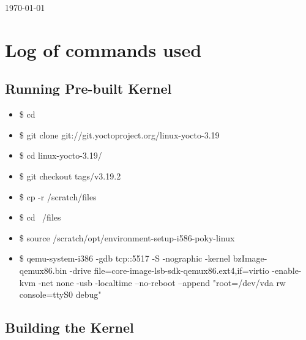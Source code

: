 \documentclass{article}
\begin{document}
\begin{titlepage}
{\large \today}\\[3cm] %




\vfill %



\end{titlepage}

\tableofcontents
\newpage

\section{Log of commands used}
\label{sec:introduction}

\subsection{Running Pre-built Kernel}

\begin{itemize}
\item \$ cd ~
\item \$ git clone git://git.yoctoproject.org/linux-yocto-3.19
\item \$ cd linux-yocto-3.19/
\item \$ git checkout tags/v3.19.2
\item \$ cp -r /scratch/files ~
\item \$ cd ~/files
\item\$  source /scratch/opt/environment-setup-i586-poky-linux
\item \$ qemu-system-i386 -gdb tcp::5517 -S -nographic -kernel bzImage-qemux86.bin -drive file=core-image-lsb-sdk-qemux86.ext4,if=virtio -enable-kvm -net none -usb -localtime --no-reboot --append "root=/dev/vda rw console=ttyS0 debug"
\end{itemize}

\subsection{Building the Kernel}
\end{document}
